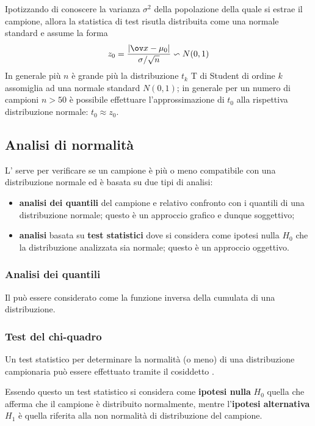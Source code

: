 		Ipotizzando di conoscere la varianza $\sigma^2$ della popolazione della quale si estrae il campione, allora la statistica di test risutla distribuita come una normale standard e assume la forma
		\[ z_0 = \frac{|\ov x - \mu_0|}{\sigma/\sqrt n} \backsim N(0,1) \]
		In generale più $n$ è grande più la distribuzione $t_k$ T di Student di ordine $k$ assomiglia ad una normale standard $N(0,1)$; in generale per un numero di campioni $n>50$ è possibile effettuare l'approssimazione di $t_0$ alla rispettiva distribuzione normale: $t_0\approx z_0$.
		
		
	\subsection{Analisi di normalità}
		L' serve per verificare se un campione è più o meno compatibile con una distribuzione normale ed è basata su due tipi di analisi:
		\begin{itemize}
			\item \textbf{analisi dei quantili} del campione e relativo confronto con i quantili di una distribuzione normale; questo è un approccio grafico e dunque soggettivo;
			\item \textbf{analisi} basata su \textbf{test statistici} dove si considera come ipotesi nulla $H_0$ che la distribuzione analizzata sia normale; questo è un approccio oggettivo.
		\end{itemize}
		
		\subsubsection{Analisi dei quantili}
		Il  può essere considerato come la funzione inversa della cumulata di una distribuzione.
		
		
		
		\subsubsection{Test del chi-quadro} 
		Un test statistico per determinare la normalità (o meno) di una distribuzione campionaria può essere effettuato tramite il cosiddetto . 
		
		Essendo questo un test statistico si considera come \textbf{ipotesi nulla} $H_0$ quella che afferma che il campione è distribuito normalmente, mentre l'\textbf{ipotesi alternativa} $H_1$ è quella riferita alla non normalità di distribuzione del campione.
		
